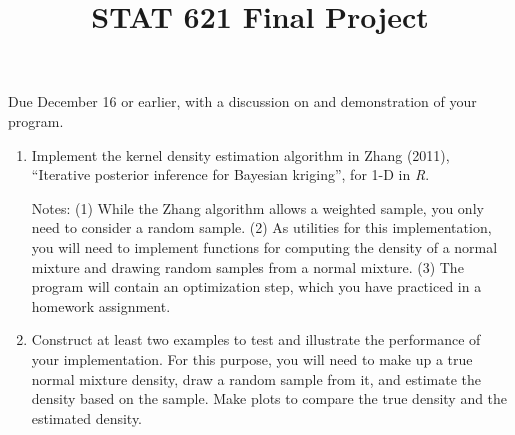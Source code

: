 \documentclass[12pt]{article}
\begin{document}
\title{STAT 621 Final Project}
\date{}\author{}
\maketitle

Due December 16 or earlier,
with a discussion on and demonstration of your program.

\begin{enumerate}
\item Implement the kernel density estimation algorithm
    in Zhang (2011), ``Iterative posterior inference for Bayesian
    kriging'', for 1-D in \textit{R}.

    Notes:
    (1) While the Zhang algorithm allows a weighted sample,
    you only need to consider a random sample.
    (2) As utilities for this implementation, you will need to
    implement functions for computing the density of a normal mixture
    and drawing random samples from a normal mixture.
    (3) The program will contain an optimization step, which you have
    practiced in a homework assignment.

\item Construct at least two examples to test and illustrate the
    performance of your implementation.
    For this purpose,
    you will need to make up a true normal mixture density,
    draw a random sample from it, and estimate the density based on the
    sample. Make plots to compare the true density and the estimated
    density.
\end{enumerate}
\end{document}

